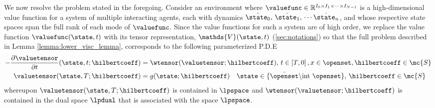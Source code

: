 We now resolve the problem stated in the foregoing. Consider an environment where $\valuefunc \in \mathbb{R}^{I_0 \times I_1 \times \cdots \times I_{N-1}}$ is a high-dimensional value function for a system  of multiple interacting agents, each with dynamics $\dot{\state_0}, \, \dot{\state_1}, \, \cdots \dot{\state_n}$, and whose respective state spaces span the full rank of each mode of $\valuefunc$. Since the value functions for such a system are of high order, we replace the value function $\valuefunc(\state, t)$ with its tensor representation,  $\mathds{V}(\state, t)$ (\cf \autoref{sec:notations}) so that  the full problem described in Lemma \ref{lemma:lower_visc_lemma}, corresponds to the following parameterized P.D.E 
%
\begin{subequations}
	\begin{align}
		 -\dfrac{\partial \valuetensor}{\partial t}(\state, t; \hilbertcoeff) &= \wtensor(\valuetensor; \hilbertcoeff), %
		  \, t \in \left[T, 0\right],  x \in \openset, \hilbertcoeff \in \mc{S}  \\
		\valuetensor(\state, T; \hilbertcoeff) &= g(\state; \hilbertcoeff) \quad \state \in  \{ \bar{\openset} \backslash \text{int } \openset\}, \,  \hilbertcoeff \in \mc{S}
		\label{eq:lower_visc_boundary_param}
	\end{align}
	\label{eq:lower_visc_param}
\end{subequations}
% 
whereupon $\valuetensor(\state, T; \hilbertcoeff)$ is contained in $\lpspace$ and $\wtensor(\valuetensor; \hilbertcoeff)$ is contained in  the dual space $\lpdual$ that is associated with the space $\lpspace$. 


